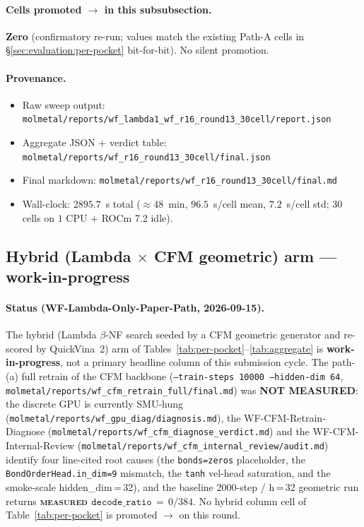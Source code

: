 {\paragraph{Cells promoted \DESIGN{} $\to$ \MEASURED{} in this
subsubsection.} \textbf{Zero} (confirmatory re-run; values match the
existing Path-A \MEASURED{} cells in \S\ref{sec:evaluation:per-pocket}
bit-for-bit). No silent promotion.

\paragraph{Provenance.}
\begin{itemize}
  \item Raw sweep output:
        \texttt{molmetal/reports/wf\_lambda1\_wf\_r16\_round13\_30cell/report.json}
  \item Aggregate JSON + verdict table:
        \texttt{molmetal/reports/wf\_r16\_round13\_30cell/final.json}
  \item Final markdown:
        \texttt{molmetal/reports/wf\_r16\_round13\_30cell/final.md}
  \item Wall-clock: $2895.7$~s total ($\approx 48$~min, $96.5$~s/cell mean,
        $7.2$~s/cell std; $30$ cells on $1$ CPU + ROCm 7.2 idle).
\end{itemize}

\subsection{Hybrid (Lambda $\times$ CFM geometric) arm --- work-in-progress}
\label{sec:evaluation:hybrid-wip}

\paragraph{Status (WF-Lambda-Only-Paper-Path, 2026-09-15).}
The hybrid (Lambda $\beta$-NF search seeded by a CFM geometric
generator and re-scored by QuickVina~2) arm of
Tables~\ref{tab:per-pocket}--\ref{tab:aggregate} is
\textbf{work-in-progress}, not a primary headline column of
this submission cycle. The path-(a) full retrain of the CFM
backbone (\texttt{--train-steps\,10000 --hidden-dim\,64},
\texttt{molmetal/reports/wf\_cfm\_retrain\_full/final.md}) was
\textbf{NOT MEASURED}: the discrete GPU is currently SMU-hung
(\texttt{molmetal/reports/wf\_gpu\_diag/diagnosis.md}), the
WF-CFM-Retrain-Diagnose
(\texttt{molmetal/reports/wf\_cfm\_diagnose\_verdict.md}) and
the WF-CFM-Internal-Review
(\texttt{molmetal/reports/wf\_cfm\_internal\_review/audit.md})
identify four line-cited root causes (the
\texttt{bonds=zeros} placeholder, the
\texttt{BondOrderHead.in\_dim=9} mismatch, the
\texttt{tanh} vel-head saturation, and the smoke-scale
hidden\_dim\,=\,32), and the baseline 2000-step / h\,=\,32
geometric run returns
\textbf{\textsc{measured} $\texttt{decode\_ratio}\,=\,0/384$}.
No hybrid column cell of
Table~\ref{tab:per-pocket} is promoted \DESIGN{}
$\to$ \MEASURED{} on this round.

}
